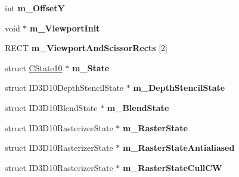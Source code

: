 \begin{DoxyCompactItemize}
\item 
\hypertarget{class_c_tw_graph_direct3_d10_abc5fb64fd0591378b679ddc8c5b5e77c}{int {\bfseries m\+\_\+\+Offset\+Y}}\label{class_c_tw_graph_direct3_d10_abc5fb64fd0591378b679ddc8c5b5e77c}

\item 
\hypertarget{class_c_tw_graph_direct3_d10_aa2731637fb7d1f9305f579c9e3b37ea8}{void $\ast$ {\bfseries m\+\_\+\+Viewport\+Init}}\label{class_c_tw_graph_direct3_d10_aa2731637fb7d1f9305f579c9e3b37ea8}

\item 
\hypertarget{class_c_tw_graph_direct3_d10_a1fe0ed5290a4dfac13ce47ed9404112f}{R\+E\+C\+T {\bfseries m\+\_\+\+Viewport\+And\+Scissor\+Rects} \mbox{[}2\mbox{]}}\label{class_c_tw_graph_direct3_d10_a1fe0ed5290a4dfac13ce47ed9404112f}

\item 
\hypertarget{class_c_tw_graph_direct3_d10_a0ecc333c5fc0af0da672a932503c57c8}{struct \hyperlink{struct_c_state10}{C\+State10} $\ast$ {\bfseries m\+\_\+\+State}}\label{class_c_tw_graph_direct3_d10_a0ecc333c5fc0af0da672a932503c57c8}

\item 
\hypertarget{class_c_tw_graph_direct3_d10_a297c823f6368db6685d3222511107481}{struct I\+D3\+D10\+Depth\+Stencil\+State $\ast$ {\bfseries m\+\_\+\+Depth\+Stencil\+State}}\label{class_c_tw_graph_direct3_d10_a297c823f6368db6685d3222511107481}

\item 
\hypertarget{class_c_tw_graph_direct3_d10_a843a85e541f7621f0e68da1510979088}{struct I\+D3\+D10\+Blend\+State $\ast$ {\bfseries m\+\_\+\+Blend\+State}}\label{class_c_tw_graph_direct3_d10_a843a85e541f7621f0e68da1510979088}

\item 
\hypertarget{class_c_tw_graph_direct3_d10_a72690d29899678ff6c901f0c579f94be}{struct I\+D3\+D10\+Rasterizer\+State $\ast$ {\bfseries m\+\_\+\+Raster\+State}}\label{class_c_tw_graph_direct3_d10_a72690d29899678ff6c901f0c579f94be}

\item 
\hypertarget{class_c_tw_graph_direct3_d10_a3a11acd7bd99439e2f4d577c9bc3b392}{struct I\+D3\+D10\+Rasterizer\+State $\ast$ {\bfseries m\+\_\+\+Raster\+State\+Antialiased}}\label{class_c_tw_graph_direct3_d10_a3a11acd7bd99439e2f4d577c9bc3b392}

\item 
\hypertarget{class_c_tw_graph_direct3_d10_a3a081082ce1db162e9ef51a50f2030bf}{struct I\+D3\+D10\+Rasterizer\+State $\ast$ {\bfseries m\+\_\+\+Raster\+State\+Cull\+C\+W}}\label{class_c_tw_graph_direct3_d10_a3a081082ce1db162e9ef51a50f2030bf}


\end{DoxyCompactItemize}
